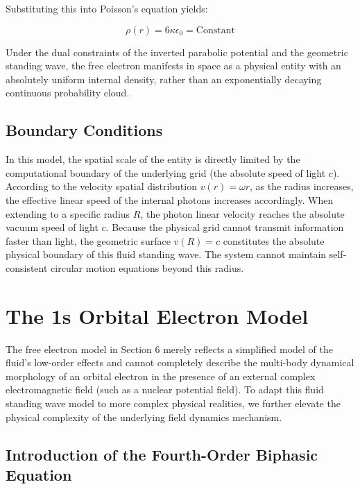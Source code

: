 \documentclass[12pt, a4paper]{article}
\begin{document}
Substituting this into Poisson's equation yields:

\begin{equation}
\rho(r) = 6\kappa\epsilon_0 = \text{Constant} 
\end{equation}

Under the dual constraints of the inverted parabolic potential and the geometric standing wave, the free electron manifests in space as a physical entity with an absolutely uniform internal density, rather than an exponentially decaying continuous probability cloud.

\subsection{Boundary Conditions}

In this model, the spatial scale of the entity is directly limited by the computational boundary of the underlying grid (the absolute speed of light $c$).\\
According to the velocity spatial distribution $v(r) = \omega r$, as the radius increases, the effective linear speed of the internal photons increases accordingly. When extending to a specific radius $R$, the photon linear velocity reaches the absolute vacuum speed of light $c$. Because the physical grid cannot transmit information faster than light, the geometric surface $v(R)=c$ constitutes the absolute physical boundary of this fluid standing wave. The system cannot maintain self-consistent circular motion equations beyond this radius.


\section{The 1s Orbital Electron Model}

The free electron model in Section 6 merely reflects a simplified model of the fluid's low-order effects and cannot completely describe the multi-body dynamical morphology of an orbital electron in the presence of an external complex electromagnetic field (such as a nuclear potential field). To adapt this fluid standing wave model to more complex physical realities, we further elevate the physical complexity of the underlying field dynamics mechanism.

\subsection{Introduction of the Fourth-Order Biphasic Equation}
\end{document}
